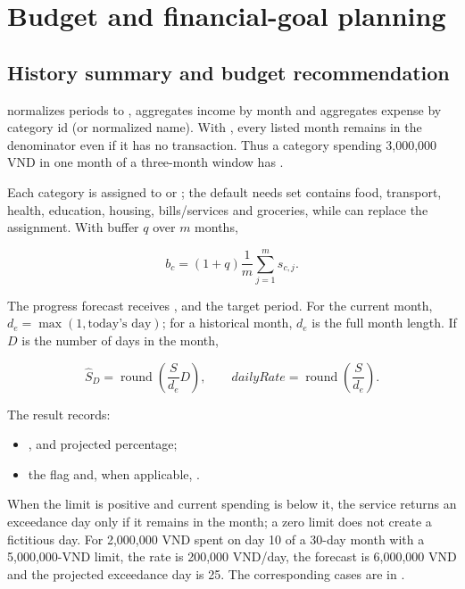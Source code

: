 \section{Budget and financial-goal planning}
\label{app:planning-algorithms}

\subsection{History summary and budget recommendation}

 normalizes periods to , aggregates income by month and aggregates expense by category id (or normalized name). With , every listed month remains in the denominator even if it has no transaction. Thus a category spending 3,000,000 VND in one month of a three-month window has .

Each category is assigned to  or ; the default needs set contains food, transport, health, education, housing, bills/services and groceries, while  can replace the assignment. With buffer $q$ over $m$ months,

\begin{equation}
  b_c=(1+q)\frac{1}{m}\sum_{j=1}^{m}s_{c,j}.
\end{equation}

The progress forecast receives ,  and the target period. For the current month, $d_e=\max(1,\text{today's day})$; for a historical month, $d_e$ is the full month length. If $D$ is the number of days in the month,

\begin{equation}
  \widehat S_D=\operatorname{round}\!\left(\frac{S}{d_e}D\right),
  \qquad dailyRate=\operatorname{round}\!\left(\frac{S}{d_e}\right).
\end{equation}

The result records:
\begin{itemize}
  \item {},  and projected percentage;
  \item the  flag and, when applicable, .
\end{itemize}
When the limit is positive and current spending is below it, the service returns an exceedance day only if it remains in the month; a zero limit does not create a fictitious day. For 2,000,000 VND spent on day 10 of a 30-day month with a 5,000,000-VND limit, the rate is 200,000 VND/day, the forecast is 6,000,000 VND and the projected exceedance day is 25. The corresponding cases are in .

